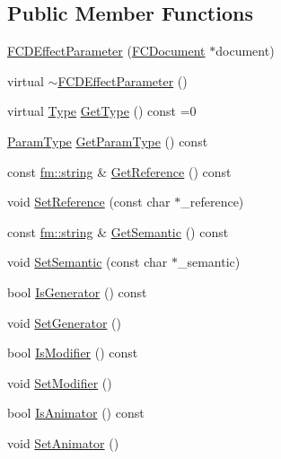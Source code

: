 \subsection*{Public Member Functions}
\begin{DoxyCompactItemize}
\item 
\hyperlink{classFCDEffectParameter_aab5e11cc5f59d90be17fd8db28146826}{FCDEffectParameter} (\hyperlink{classFCDocument}{FCDocument} $\ast$document)
\item 
virtual \hyperlink{classFCDEffectParameter_ad0314597c4be5629a6b55927ed32f15a}{$\sim$FCDEffectParameter} ()
\item 
virtual \hyperlink{classFCDEffectParameter_a1efe74553d2ed199435085c171743b08}{Type} \hyperlink{classFCDEffectParameter_a5858946f333ea4486ca30c4c1b104871}{GetType} () const =0
\item 
\hyperlink{classFCDEffectParameter_a25a513057c610179b5229dc99e840bb9}{ParamType} \hyperlink{classFCDEffectParameter_a48ab8e00ca3648e54795864a901e1b2e}{GetParamType} () const 
\item 
const \hyperlink{classfm_1_1stringT}{fm::string} \& \hyperlink{classFCDEffectParameter_a7f736431830ef8d76e9410747546c6d8}{GetReference} () const 
\item 
void \hyperlink{classFCDEffectParameter_a5a1af6ade68203ece99e22e2334e7dda}{SetReference} (const char $\ast$\_\-reference)
\item 
const \hyperlink{classfm_1_1stringT}{fm::string} \& \hyperlink{classFCDEffectParameter_a766c4c57cce34ae74c7946a166cd4141}{GetSemantic} () const 
\item 
void \hyperlink{classFCDEffectParameter_ab7a042b8a3df0d6c72892ecca6c2f3e1}{SetSemantic} (const char $\ast$\_\-semantic)
\item 
bool \hyperlink{classFCDEffectParameter_aa77e878bbff4b0d7a85c3f08e46bb206}{IsGenerator} () const 
\item 
void \hyperlink{classFCDEffectParameter_ae9e19c411f12e1f456a45be82b4ddf6a}{SetGenerator} ()
\item 
bool \hyperlink{classFCDEffectParameter_af0270639bc9e73ca45c15fbbebdc8066}{IsModifier} () const 
\item 
void \hyperlink{classFCDEffectParameter_a620f3208cb12bb3017635fa43cd5b0cf}{SetModifier} ()
\item 
bool \hyperlink{classFCDEffectParameter_ab592fa7e739aefa0428d7ef5c5ef802c}{IsAnimator} () const 
\item 
void \hyperlink{classFCDEffectParameter_a3f4336d517d28228d97b7d6ba64b0f7f}{SetAnimator} ()

\end{DoxyCompactItemize}
